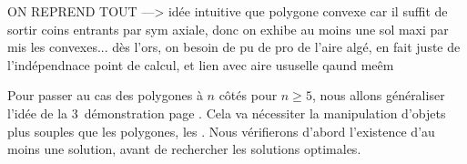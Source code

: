 ON REPREND TOUT
	---> idée intuitive que polygone convexe car il suffit de sortir coins entrants par sym axiale, donc on exhibe au moins une sol maxi par mis les convexes... 
	dès l'ors, on besoin de pu de pro de l'aire algé, en fait juste de l'indépendnace point de calcul, et lien avec aire ususelle qaund meêm


Pour passer au cas des polygones à $n$ côtés pour $n \geq 5$, nous allons généraliser l'idée de la 3\ieme\ démonstration page \pageref{tri-topo-comp}. Cela va nécessiter la manipulation d'objets plus souples que les polygones, les \ncycles.
Nous vérifierons d’abord l’existence d’au moins une solution, 
avant de rechercher les solutions optimales.%
